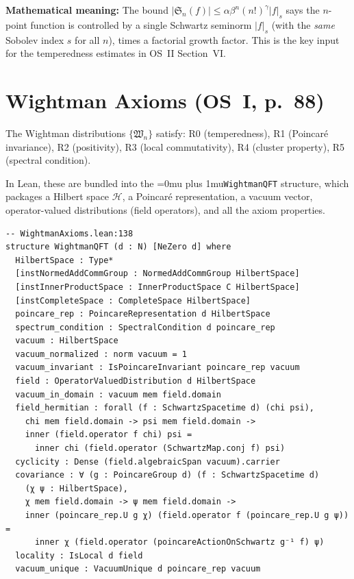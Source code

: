\documentclass[11pt,a4paper]{article}
\newcommand{\leanname}[1]{\begingroup\Urlmuskip=0mu plus 1mu\relax\nolinkurl{#1}\endgroup}
\begin{document}
\noindent\textbf{Mathematical meaning:}
The bound $|\mathfrak{S}_n(f)| \leq \alpha \beta^n (n!)^\gamma |f|_s$
says the $n$-point function is controlled by a single Schwartz seminorm
$|f|_s$ (with the \emph{same} Sobolev index $s$ for all $n$), times a
factorial growth factor. This is the key input for the temperedness
estimates in OS~II Section~VI.

\section{Wightman Axioms (OS~I, p.~88)}

The Wightman distributions $\{\mathfrak{W}_n\}$ satisfy:
R0 (temperedness), R1 (Poincar\'e invariance), R2 (positivity),
R3 (local commutativity), R4 (cluster property), R5 (spectral condition).

In Lean, these are bundled into the \leanname{WightmanQFT} structure, which
packages a Hilbert space $\mathscr{H}$, a Poincar\'e representation, a vacuum
vector, operator-valued distributions (field operators), and all the axiom
properties.

\begin{lstlisting}
-- WightmanAxioms.lean:138
structure WightmanQFT (d : N) [NeZero d] where
  HilbertSpace : Type*
  [instNormedAddCommGroup : NormedAddCommGroup HilbertSpace]
  [instInnerProductSpace : InnerProductSpace C HilbertSpace]
  [instCompleteSpace : CompleteSpace HilbertSpace]
  poincare_rep : PoincareRepresentation d HilbertSpace
  spectrum_condition : SpectralCondition d poincare_rep
  vacuum : HilbertSpace
  vacuum_normalized : norm vacuum = 1
  vacuum_invariant : IsPoincareInvariant poincare_rep vacuum
  field : OperatorValuedDistribution d HilbertSpace
  vacuum_in_domain : vacuum mem field.domain
  field_hermitian : forall (f : SchwartzSpacetime d) (chi psi),
    chi mem field.domain -> psi mem field.domain ->
    inner (field.operator f chi) psi =
      inner chi (field.operator (SchwartzMap.conj f) psi)
  cyclicity : Dense (field.algebraicSpan vacuum).carrier
  covariance : ∀ (g : PoincareGroup d) (f : SchwartzSpacetime d)
    (χ ψ : HilbertSpace),
    χ mem field.domain -> ψ mem field.domain ->
    inner (poincare_rep.U g χ) (field.operator f (poincare_rep.U g ψ)) =
      inner χ (field.operator (poincareActionOnSchwartz g⁻¹ f) ψ)
  locality : IsLocal d field
  vacuum_unique : VacuumUnique d poincare_rep vacuum
\end{lstlisting}
\end{document}
